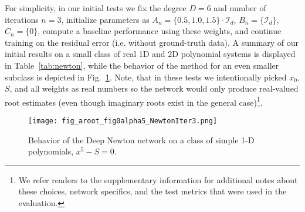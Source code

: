 \documentclass{article}
\DeclareMathOperator*{\argmin}{arg\,min}
\begin{document}

For simplicity, in our initial tests we fix the degree $D=6$ and number of iterations $n=3$, initialize parameters as \mbox{$A_n=\{ 0.5, 1.0, 1.5 \}\cdot \mathcal{I}_d$}, $B_n=\{\mathcal{I}_d\}$, $C_n=\{0\}$, compute a baseline performance using these weights, and continue training on the residual error (i.e. without ground-truth data). A summary of our initial results on a small class of real 1D and 2D polynomial systems is displayed in Table~\ref{tab:newton}, while the behavior of the method for an even smaller subclass is depicted in Fig.~\ref{fig:newton_aroot}. Note, that in these tests we intentionally picked $x_0$, $S$, and all weights as real numbers so the network would only produce real-valued root estimates (even though imaginary roots exist in the general case)\footnote{We refer readers to the supplementary information for additional notes about these choices, network specifics, and the test metrics that were used in the evaluation.}.
\begin{figure}[hbt!]
    \centering
    \texttt{[image: fig\_aroot\_fig0alpha5\_NewtonIter3.png]}
    \caption{Behavior of the Deep Newton network on a class of simple 1-D polynomials, $x^5 - S = 0$.} %
    \label{fig:newton_aroot}
\end{figure}
\end{document}
